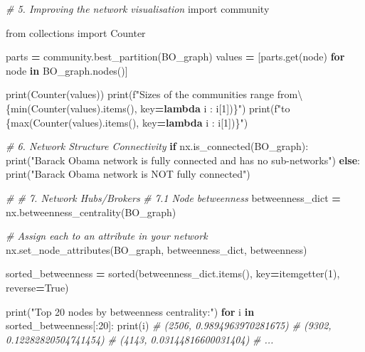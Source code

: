 \documentclass[
]{article}
\newenvironment{Shaded}{\begin{snugshade}}{\end{snugshade}}
\newcommand{\BuiltInTok}[1]{#1}
\newcommand{\CommentTok}[1]{\textcolor[rgb]{0.56,0.35,0.01}{\textit{#1}}}
\newcommand{\ControlFlowTok}[1]{\textcolor[rgb]{0.13,0.29,0.53}{\textbf{#1}}}
\newcommand{\DecValTok}[1]{\textcolor[rgb]{0.00,0.00,0.81}{#1}}
\newcommand{\ImportTok}[1]{#1}
\newcommand{\KeywordTok}[1]{\textcolor[rgb]{0.13,0.29,0.53}{\textbf{#1}}}
\newcommand{\NormalTok}[1]{#1}
\newcommand{\OperatorTok}[1]{\textcolor[rgb]{0.81,0.36,0.00}{\textbf{#1}}}
\newcommand{\SpecialCharTok}[1]{\textcolor[rgb]{0.00,0.00,0.00}{#1}}
\newcommand{\SpecialStringTok}[1]{\textcolor[rgb]{0.31,0.60,0.02}{#1}}
\newcommand{\StringTok}[1]{\textcolor[rgb]{0.31,0.60,0.02}{#1}}
\newcommand{\VariableTok}[1]{\textcolor[rgb]{0.00,0.00,0.00}{#1}}
\begin{document}
\begin{Shaded}
\begin{Highlighting}[]
\CommentTok{\# 5. Improving the network visualisation}
\ImportTok{import}\NormalTok{ community}

\ImportTok{from}\NormalTok{ collections }\ImportTok{import}\NormalTok{ Counter}

\NormalTok{parts }\OperatorTok{=}\NormalTok{ community.best\_partition(BO\_graph)}
\NormalTok{values }\OperatorTok{=}\NormalTok{ [parts.get(node) }\ControlFlowTok{for}\NormalTok{ node }\KeywordTok{in}\NormalTok{ BO\_graph.nodes()]}

\BuiltInTok{print}\NormalTok{(Counter(values))}
\BuiltInTok{print}\NormalTok{(}\SpecialStringTok{f"Sizes of the communities range from\textbackslash{}}
\SpecialStringTok{  }\SpecialCharTok{\{}\BuiltInTok{min}\NormalTok{(Counter(values).items(), key}\OperatorTok{=}\KeywordTok{lambda}\NormalTok{ i : i[}\DecValTok{1}\NormalTok{])}\SpecialCharTok{\}}\SpecialStringTok{"}\NormalTok{)}
\BuiltInTok{print}\NormalTok{(}\SpecialStringTok{f"to }\SpecialCharTok{\{}\BuiltInTok{max}\NormalTok{(Counter(values).items(), key}\OperatorTok{=}\KeywordTok{lambda}\NormalTok{ i : i[}\DecValTok{1}\NormalTok{])}\SpecialCharTok{\}}\SpecialStringTok{"}\NormalTok{)}

\CommentTok{\# 6.    Network Structure Connectivity}
\ControlFlowTok{if}\NormalTok{ nx.is\_connected(BO\_graph):}
    \BuiltInTok{print}\NormalTok{(}\StringTok{"Barack Obama network is fully connected and has no sub{-}networks"}\NormalTok{)}
\ControlFlowTok{else}\NormalTok{:}
    \BuiltInTok{print}\NormalTok{(}\StringTok{"Barack Obama network is NOT fully connected"}\NormalTok{)}

\CommentTok{\# \# 7. Network Hubs/Brokers}
\CommentTok{\# 7.1 Node betweenness}
\NormalTok{betweenness\_dict }\OperatorTok{=}\NormalTok{ nx.betweenness\_centrality(BO\_graph)}

\CommentTok{\# Assign each to an attribute in your network}
\NormalTok{nx.set\_node\_attributes(BO\_graph, betweenness\_dict, }\StringTok{\textquotesingle{}betweenness\textquotesingle{}}\NormalTok{)}

\NormalTok{sorted\_betweenness }\OperatorTok{=} \BuiltInTok{sorted}\NormalTok{(betweenness\_dict.items(), }
\NormalTok{  key}\OperatorTok{=}\NormalTok{itemgetter(}\DecValTok{1}\NormalTok{), }
\NormalTok{  reverse}\OperatorTok{=}\VariableTok{True}\NormalTok{)}

\BuiltInTok{print}\NormalTok{(}\StringTok{"Top 20 nodes by betweenness centrality:"}\NormalTok{)}
\ControlFlowTok{for}\NormalTok{ i }\KeywordTok{in}\NormalTok{ sorted\_betweenness[:}\DecValTok{20}\NormalTok{]:}
    \BuiltInTok{print}\NormalTok{(i)}
\CommentTok{\# (\textquotesingle{}2506\textquotesingle{}, 0.9894963970281675)}
\CommentTok{\# (\textquotesingle{}9302\textquotesingle{}, 0.12282820504741454)}
\CommentTok{\# (\textquotesingle{}4143\textquotesingle{}, 0.03144816600031404)}
\CommentTok{\# ...}


\end{Highlighting}
\end{Shaded}
\end{document}
